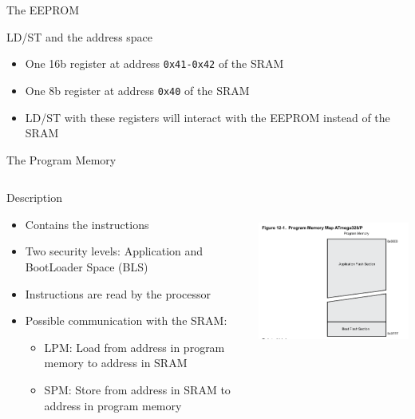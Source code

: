 \begin{reveals}
\begin{frame}[c]{The EEPROM}
  \begin{block}{LD/ST and the address space}
    \begin{itemize}
    \item One 16b register at address \texttt{0x41-0x42} of the SRAM
    \item One 8b register at address \texttt{0x40} of the SRAM
    \item LD/ST with these registers will interact with the EEPROM
      instead of the SRAM
    \end{itemize}
  \end{block}


\end{frame}


\begin{frame}{The Program Memory}
  
  \begin{columns}
    \begin{column}{0.45\textwidth}
      \begin{block}{Description}
        \begin{itemize}
        \item Contains the instructions
        \item Two security levels: Application and BootLoader Space (BLS)
        \item Instructions are read by the processor
        \item Possible communication with the SRAM:
          \begin{itemize}
          \item LPM: Load from address in program memory to address in SRAM
          \item SPM: Store from address in SRAM to address in program memory
          \end{itemize}
        \end{itemize}
      \end{block}
      
    \end{column}

    \begin{column}{0.45\textwidth}
      \begin{center}
        \includegraphics[trim=200 0 20 40 ,clip,height=6cm]{images/arduino-progmem.png}
      \end{center}      
    \end{column}
  \end{columns}



\end{frame}
\end{reveals}
